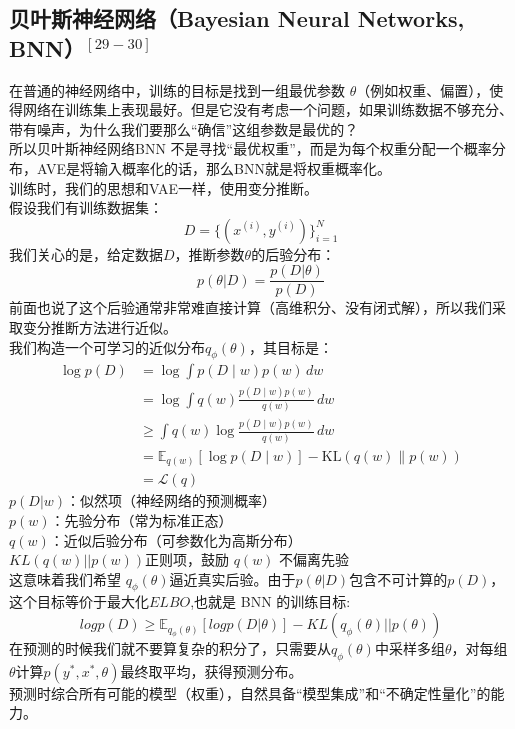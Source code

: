\documentclass[final]{ws-ijseke}
\begin{document}
\subsection{贝叶斯神经网络（Bayesian Neural Networks, BNN）$^{[29-30]}$}
\hspace*{2em}在普通的神经网络中，训练的目标是找到一组最优参数 $\theta$（例如权重、偏置），使得网络在训练集上表现最好。但是它没有考虑一个问题，如果训练数据不够充分、带有噪声，为什么我们要那么“确信”这组参数是最优的？\\
\hspace*{2em}所以贝叶斯神经网络BNN 不是寻找“最优权重”，而是为每个权重分配一个概率分布，AVE是将输入概率化的话，那么BNN就是将权重概率化。\\
训练时，我们的思想和VAE一样，使用变分推断。\\
假设我们有训练数据集：
\begin{equation*}
D=\{(x^{(i)},y^{(i)})\}_{i=1}^N
\end{equation*}
我们关心的是，给定数据$D$，推断参数$\theta$的后验分布：
\begin{equation*}
p(\theta|D) = \frac{p(D|\theta)}{p(D)}
\end{equation*}
\hspace*{2em}前面也说了这个后验通常非常难直接计算（高维积分、没有闭式解），所以我们采取变分推断方法进行近似。\\
我们构造一个可学习的近似分布$q_\phi(\theta)$，其目标是：
\begin{align*}
\log p(D)
&= \log \int p(D \mid w) p(w) \, dw \\
&= \log \int q(w) \frac{p(D \mid w) p(w)}{q(w)} \, dw \\
&\geq \int q(w) \log \frac{p(D \mid w) p(w)}{q(w)} \, dw \\
&= \mathbb{E}_{q(w)}[\log p(D \mid w)] - \mathrm{KL}(q(w) \| p(w)) \\
&= \mathcal{L}(q)
\end{align*}
$p(D|w)$：似然项（神经网络的预测概率）\\
$p(w)$：先验分布（常为标准正态）\\
$q(w)$：近似后验分布（可参数化为高斯分布）\\
$KL(q(w)||p(w))$正则项，鼓励 $q(w)$ 不偏离先验\\

这意味着我们希望 $q_\phi(\theta)$逼近真实后验。由于$p(\theta|D)$包含不可计算的$p(D)$，这个目标等价于最大化$ELBO$,也就是 BNN 的训练目标:
\begin{equation*}
logp(D) \ge \mathbb{E}_{q_\phi(\theta)}[logp(D|\theta)]-KL(q_\phi(\theta)||p(\theta))
\end{equation*}
\hspace*{2em}在预测的时候我们就不要算复杂的积分了，只需要从$q_\phi(\theta)$中采样多组$\theta$，对每组$\theta$计算$p(y^*,x^*,\theta)$最终取平均，获得预测分布。\\
预测时综合所有可能的模型（权重），自然具备“模型集成”和“不确定性量化”的能力。
\end{document}
